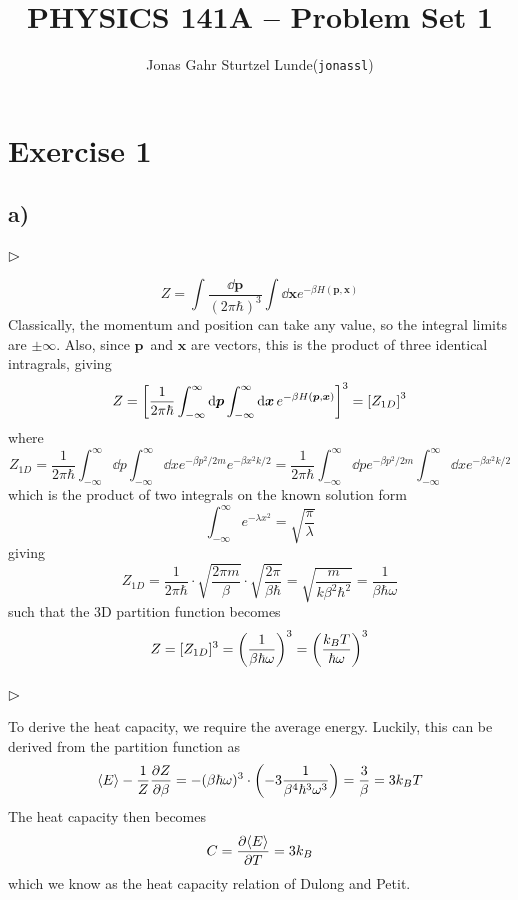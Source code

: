 \documentclass[12p,a4paper]{article}
\renewcommand{\exp}{e^}
\renewcommand{\b}{\boldsymbol}
\renewcommand{\exp}{e^}
\begin{document}
\title{PHYSICS 141A -- Problem Set 1}
\author{
    \begin{tabular}{r l}
        Jonas Gahr Sturtzel Lunde & (\texttt{jonassl})
    \end{tabular}}

\maketitle

\hspace{10cm}

\section*{Exercise 1}
\subsection*{a)}
\subsubsection*{$\rhd$}
\[
    Z = \int \frac{\dd{\b p}}{(2\pi\hbar)^3}\int \dd{\b x} \exp{-\beta H(\b p, \b x)}
\]
Classically, the momentum and position can take any value, so the integral limits are $\pm \infty$. Also, since $\b p$ and $\b x$ are vectors, this is the product of three identical intragrals, giving
\[
    Z = \qty[\frac{1}{2\pi\hbar}\int_{-\infty}^{\infty} \dd{\b p} \int_{-\infty}^{\infty} \dd{\b x} \exp{-\beta H(\b p, \b x)}]^3 = \qty[Z_{1D}]^3
\]
where
\[
    Z_{1D} = \frac{1}{2\pi\hbar}\int_{-\infty}^{\infty} \dd{ p} \int_{-\infty}^{\infty} \dd{ x} \exp{-\beta p^2 /2m }\exp{-\beta x^2k/2} = \frac{1}{2\pi\hbar}\int_{-\infty}^{\infty} \dd{p} \exp{-\beta p^2 /2m } \int_{-\infty}^{\infty} \dd{ x}\exp{-\beta x^2k/2}
\]
which is the product of two integrals on the known solution form
\[
    \int_{-\infty}^{\infty} \exp{-\lambda x^2} = \sqrt{\frac{\pi}{\lambda}}
\]
giving
\[
    Z_{1D} = \frac{1}{2\pi\hbar}\cdot \sqrt{\frac{2\pi m}{\beta}}\cdot \sqrt{\frac{2\pi}{\beta\hbar}} = \sqrt{\frac{m}{k\beta^2\hbar^2}} = \frac{1}{\beta\hbar\omega}
\]
such that the 3D partition function becomes
\[
    Z = [Z_{1D}]^3 = \qty(\frac{1}{\beta\hbar\omega})^3 = \qty(\frac{k_BT}{\hbar\omega})^3
\]


\subsubsection*{$\rhd$}
To derive the heat capacity, we require the average energy. Luckily, this can be derived from the partition function as
\[
    \langle E \rangle -\frac{1}{Z}\pdv{Z}{\beta} = -(\beta\hbar\omega)^3 \cdot\qty(-3\frac{1}{\beta^4\hbar^3\omega^3}) = \frac{3}{\beta} = 3k_BT
\]
The heat capacity then becomes
\[
    C = \pdv{\langle E \rangle}{T} = 3k_B
\]
which we know as the heat capacity relation of Dulong and Petit.
\end{document}
